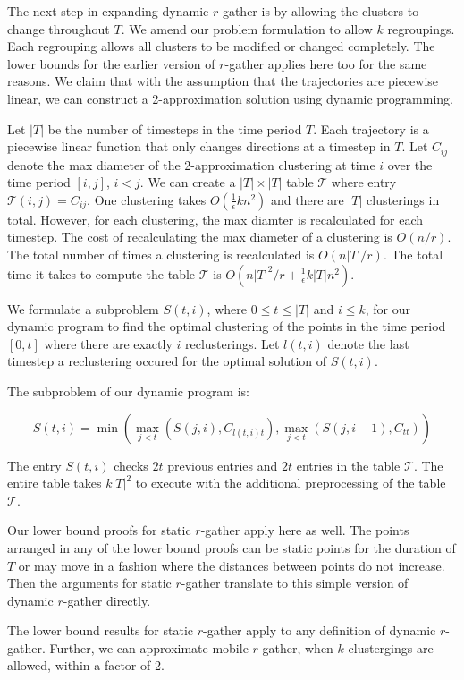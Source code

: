The next step in expanding dynamic $r$-gather is by allowing the clusters to change throughout $T$.  We amend our problem formulation to allow $k$ regroupings.  Each regrouping allows all clusters to be modified or changed completely.  The lower bounds for the earlier version of $r$-gather applies here too for the same reasons.  We claim that with the assumption that the trajectories are piecewise linear, we can construct a 2-approximation solution using dynamic programming.

Let $|T|$ be the number of timesteps in the time period $T$.  Each trajectory is a piecewise linear function that only changes directions at a timestep in $T$.  Let $C_{ij}$ denote the max diameter of the 2-approximation clustering at time $i$ over the time period $[i,j]$, $i<j$.  We can create a $|T| \times |T|$ table $\mathcal{T}$ where entry $\mathcal{T}(i, j) = C_{ij}$.  One clustering takes $O(\frac{1}{\epsilon}kn^2)$ and there are $|T|$ clusterings in total.  However, for each clustering, the max diamter is recalculated for each timestep.  The cost of recalculating the max diameter of a clustering is $O(n/r)$.  The total number of times a clustering is recalculated is $O(n|T|/r)$.  The total time it takes to compute the table $\mathcal{T}$ is $O(n|T|^2/r + \frac{1}{\epsilon}k|T|n^2)$.

We formulate a subproblem $S(t,i)$, where $0 \leq t \leq |T|$ and $i \leq k$, for our dynamic program to find the optimal clustering of the points in the time period $[0, t]$ where there are exactly $i$ reclusterings.  Let $l(t,i)$ denote the last timestep a reclustering occured for the optimal solution of $S(t,i)$.

The subproblem of our dynamic program is:

$$S(t,i) = \min( \max_{j<t}(S(j, i), C_{l(t,i)t}), \max_{j<t}(S(j, i-1), C_{tt}) )$$ 

The entry $S(t,i)$ checks $2t$ previous entries and $2t$ entries in the table $\mathcal{T}$.  The entire table takes $k|T|^2$ to execute with the additional preprocessing of the table $\mathcal{T}$.

Our lower bound proofs for static $r$-gather apply here as well.  The points arranged in any of the lower bound proofs can be static points for the duration of $T$ or may move in a fashion where the 
distances between points do not increase.  Then the arguments for static $r$-gather translate to this simple version of dynamic $r$-gather directly.

\begin{theorem}
The lower bound results for static $r$-gather apply to any definition of dynamic $r$-gather.  Further, we can approximate mobile $r$-gather, when $k$ clustergings are allowed, within a factor of 2.
\end{theorem}

